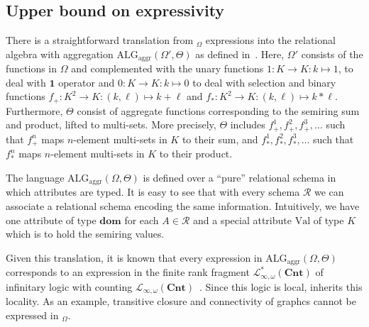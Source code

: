 \subsection{Upper bound on expressivity}
There is a straightforward translation from \ARA$_{\Omega}$ expressions into the relational algebra with aggregation $\text{ALG}_{\text{aggr}}(\Omega',\Theta)$ as defined in~\cite{LIBKIN2003}. Here, $\Omega'$ consists of the functions in $\Omega$ and complemented with the unary functions $1:K\to K:k\mapsto 1$, to deal with $\mathbf{1}$ operator and $0:K\to K:k\mapsto 0$ to deal with selection and binary functions $f_+:K^2\to K:(k,\ell)\mapsto k+\ell$ and $f_*:K^2\to K:(k,\ell)\mapsto k*\ell$.
Furthermore, $\Theta$ consist of aggregate functions corresponding to the semiring sum and product, lifted to multi-sets. More precisely,
$\Theta$ includes $f_+^1,f_+^2,f_+^3,\ldots$ such that $f_+^n$ maps
$n$-element multi-sets in $K$ to their sum, and 
 $f_*^1,f_*^2,f_*^3,\ldots$ such that $f_*^n$ maps
 $n$-element multi-sets in $K$ to their product.

The language $\text{ALG}_{\text{aggr}}(\Omega,\Theta)$ is defined over a ``pure'' relational schema in which attributes are typed. It is easy to see that with every \ARA schema $\mathcal{R}$ we can associate a relational schema encoding the same information. Intuitively, we have one attribute of type $\mathbf{dom}$ for each $A\in\mathcal{R}$ and a special attribute $\text{Val}$ of type $K$ which is to hold the semiring values.

Given this translation, it is known that every expression in  $\text{ALG}_{\text{aggr}}(\Omega,\Theta)$ corresponds to an expression in the finite rank fragment $\mathcal{L}_{\infty,\omega}^*(\textbf{Cnt})$ of infinitary logic with counting $\mathcal{L}_{\infty,\omega}(\textbf{Cnt})$~\cite{LIBKIN2003,Hella:2001}. 
Since this logic is local, \ARA inherits this locality. As an example, 
transitive closure and connectivity of graphcs cannot be expressed in \ARA$_{\Omega}$.

